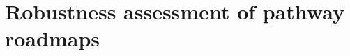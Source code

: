\documentclass[a4paper,twoside,10pt,final]{memoir} %
\begin{document}
%
%
%
%
%
%
%
%

\clearemptydoublepage
\chapter{Robustness assessment of pathway roadmaps}
\label{chap:chap_RobPol}

\clearpage

%
%
\end{document}
